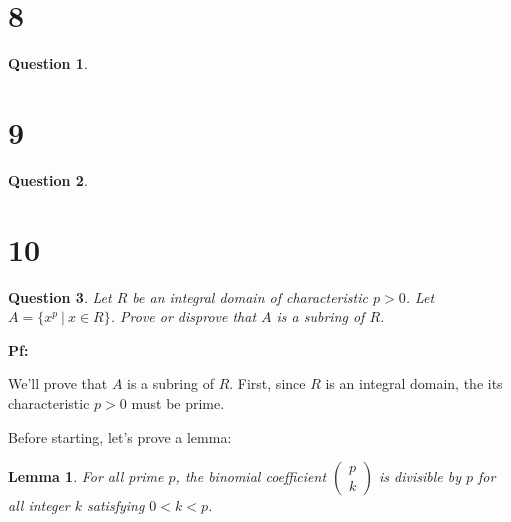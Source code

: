 \documentclass{article}
\newtheorem{question}{Question}
\newtheorem{lemma}{Lemma}
\begin{document}
\break


\section*{8}
\begin{myBox}[]{}
    \begin{question}
        
    \end{question}
\end{myBox}

\break


\section*{9}
\begin{myBox}[]{}
    \begin{question}
        
    \end{question}
\end{myBox}

\break


\section*{10}
\begin{myBox}[]{}
    \begin{question}
        Let $R$ be an integral domain of characteristic $p > 0$. Let $A = \{x^p\ |\ x\in R\}$. Prove or
        disprove that $A$ is a subring of $R$.
    \end{question}
\end{myBox}

\textbf{Pf:}

We'll prove that $A$ is a subring of $R$. First, since $R$ is an integral domain, the its characteristic $p>0$ must be prime.

\hfill

Before starting, let's prove a lemma:
\begin{lemma}
    For all prime $p$, the binomial coefficient $\begin{pmatrix}
        p\\k
    \end{pmatrix}$ is divisible by $p$ for all integer $k$ satisfying $0<k<p$.
\end{lemma}
\end{document}
